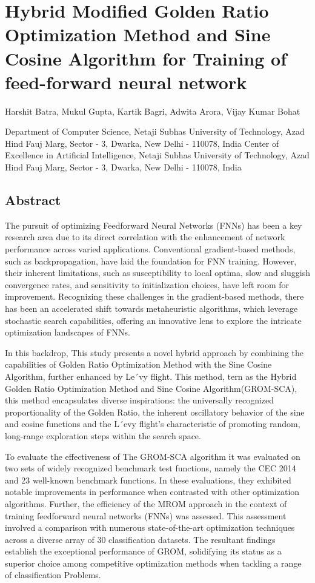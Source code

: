 \section{Hybrid Modified Golden Ratio Optimization Method and Sine Cosine Algorithm for Training of feed-forward neural network}

Harshit Batra, Mukul Gupta, Kartik Bagri, Adwita Arora, Vijay Kumar Bohat

Department of Computer Science, Netaji Subhas University of Technology, Azad Hind Fauj Marg, Sector - 3, Dwarka, New Delhi - 110078, India Center of Excellence in Artificial Intelligence, Netaji Subhas University of Technology, Azad Hind Fauj Marg, Sector - 3, Dwarka, New Delhi - 110078, India

\subsection{Abstract}

The pursuit of optimizing Feedforward Neural Networks (FNNs) has been a key research area due to its direct correlation with the enhancement of network performance across varied applications. Conventional gradient-based methods, such as backpropagation, have laid the foundation for FNN training. However, their inherent limitations, such as susceptibility to local optima, slow and sluggish convergence rates, and sensitivity to initialization choices, have left room for improvement. Recognizing these challenges in the gradient-based methods, there has been an accelerated shift towards metaheuristic algorithms, which leverage stochastic search capabilities, offering an innovative lens to explore the intricate optimization landscapes of FNNs.

In this backdrop, This study presents a novel hybrid approach by combining the capabilities of Golden Ratio Optimization Method with the Sine Cosine Algorithm, further enhanced by Le´vy flight. This method, tern as the Hybrid Golden Ratio Optimization Method and Sine Cosine Algorithm(GROM-SCA), this method encapsulates diverse inspirations: the universally recognized proportionality of the Golden Ratio, the inherent oscillatory behavior of the sine and cosine functions and the L´evy flight’s characteristic of promoting random, long-range exploration steps within the search space.

To evaluate the effectiveness of The GROM-SCA algorithm it was evaluated on two sets of widely recognized benchmark test functions, namely the CEC 2014 and 23 well-known benchmark functions. In these evaluations, they exhibited notable improvements in performance when contrasted with other optimization algorithms. Further, the efficiency of the MROM approach in the context of training feedforward neural networks (FNNs) was assessed. This assessment involved a comparison with numerous state-of-the-art optimization techniques across a diverse array of 30 classification datasets. The resultant findings establish the exceptional performance of GROM, solidifying its status as a superior choice among competitive optimization methods when tackling a range of classification Problems.

